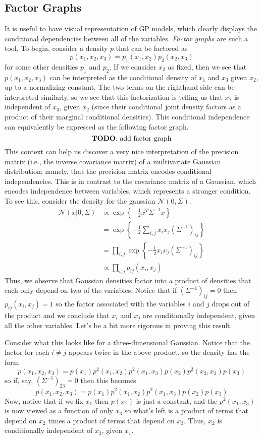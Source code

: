 \documentclass[12pt]{article}
\begin{document}
\subsection{Factor Graphs} 
It is useful to have visual representation of GP models, which clearly displays the conditional dependencies between all of the variables. \textit{Factor graphs} are such a tool. To begin, consider a density $p$
that can be factored as 
\[p(x_1, x_2, x_3) = p_1(x_1, x_2)p_2(x_2, x_3)\]
for some other densities $p_1$ and $p_2$. If we consider $x_2$ as fixed, then we see that $p(x_1, x_2, x_3)$ can be interpreted as the conditional density of $x_1$ and $x_3$ given $x_2$, up to a 
normalizing constant. The two terms on the righthand side can be interpreted similarly, so we see that this factorization is telling us that $x_1$ is independent of $x_3$, given $x_2$ (since their conditional 
joint density factors as a product of their marginal conditional densities). This conditional independence can equivalently be expressed as the following factor graph. 
\[\text{\textbf{TODO}: add factor graph}\] 
This context can help us discover a very nice interpretation of the precision matrix (i.e., the inverse covariance matrix) of a multivariate Gaussian distribution; namely, that the precision matrix encodes 
conditional independencies. This is in contrast to the covariance matrix of a Gaussian, which encodes independence between variables, which represents a stronger condition. To see this, consider the 
density for the gaussian $\mathcal{N}(0, \Sigma)$. 
\begin{align*}
\mathcal{N}(x|0, \Sigma) &\propto \exp\left\{-\frac{1}{2}x^T \Sigma^{-1}x \right\} \\
				       &= \exp\left\{-\frac{1}{2} \sum_{i, j} x_i x_j \left(\Sigma^{-1}\right)_{ij} \right\} \\
				       &= \prod_{i,j} \exp\left\{-\frac{1}{2} x_i x_j \left(\Sigma^{-1}\right)_{ij} \right\} \\
				       &\propto \prod_{i,j}  p_{ij}(x_i, x_j)
\end{align*}
Thus, we observe that Gaussian densities factor into a product of densities that each only depend on two of the variables. Notice that if $\left(\Sigma^{-1}\right)_{ij} = 0$ then 
$p_{ij}(x_i, x_j) = 1$ so the factor associated with the variables $i$ and $j$ drops out of the product and we conclude that $x_i$ and $x_j$ are conditionally independent, given all 
the other variables. Let's be a bit more rigorous in proving this result. 

Consider what this looks like for a three-dimensional Gaussian. Notice that the factor for each $i \neq j$ appears twice in the above product, so the density has the form
\[p(x_1, x_2, x_3) = p(x_1) p^2(x_1, x_2)p^2(x_1, x_3)p(x_2) p^2(x_2, x_3)p(x_3)\]
so if, say, $\left(\Sigma^{-1}\right)_{23} = 0$ then this becomes 
\[p(x_1, x_2, x_3) = p(x_1) p^2(x_1, x_2)p^2(x_1, x_3)p(x_2) p(x_3)\]
Now, notice that if we fix $x_1$ then $p(x_1)$ is just a constant, and the $p^2(x_1, x_3)$ is now viewed as a function of only $x_3$ so what's left is a product of terms that depend on 
$x_2$ times a product of terms that depend on $x_3$. Thus, $x_2$ is conditionally independent of $x_3$, given $x_1$. 
\end{document}

